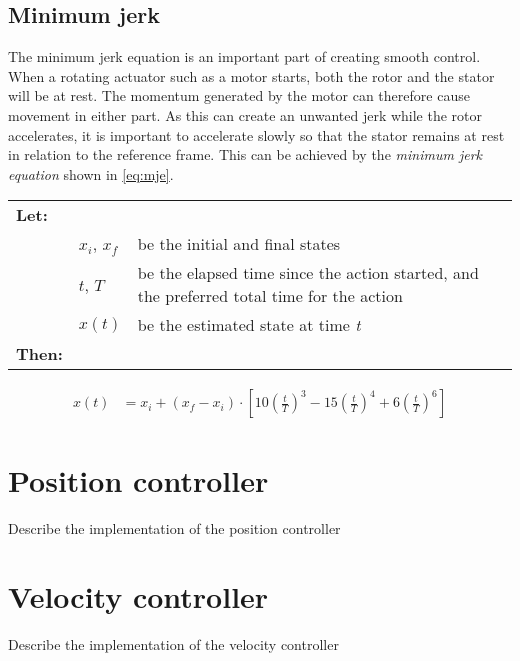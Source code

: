\documentclass[11pt]{article}
\begin{document}
\subsection{Minimum jerk}
The minimum jerk equation is an important part of creating smooth control. When a rotating actuator such as a motor starts, both the rotor and the stator will be at rest. The momentum generated by the motor can therefore cause movement in either part. As this can create an unwanted jerk while the rotor accelerates, it is important to accelerate slowly so that the stator remains at rest in relation to the reference frame. This can be achieved by the \emph{minimum jerk equation} shown in \vref{eq:mje}.
\par \vspace{10pt}
{\footnotesize
  \begin{tabular}{l l l}
    \textbf{Let:} \\
 &$x_i$, $x_f$ &be the initial and final states\\
 &$t$, $T$ &be the elapsed time since the action started, and the preferred total time for the action  \\
 &$x(t)$ &be the estimated state at time \emph{t} \\
    \textbf{Then:}
  \end{tabular}
  \begin{align}
    x(t) &= x_i +  (x_f - x_i) \cdot \left[10\left(\frac{t}{T}\right)^3 - 15\left(\frac{t}{T}\right)^4 + 6\left(\frac{t}{T}\right)^6 \right]\label{eq:mje}
  \end{align}}
\par

\section{Position controller}
Describe the implementation of the position controller
\section{Velocity controller}
Describe the implementation of the velocity controller
\end{document}
